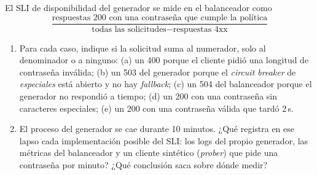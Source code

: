 \documentclass[variant=guia,cover=institutional,mode=screen]{ua-engineering-v6-article}
\begin{document}
\begin{uaexercise}
El SLI de disponibilidad del generador se mide en el balanceador como
\[
\frac{\text{respuestas 200 con una contraseña que cumple la política}}{\text{todas las solicitudes} - \text{respuestas 4xx}}
\]
\begin{enumerate}
\item Para cada caso, indique si la solicitud suma al numerador, solo al denominador o a ninguno: (a) un 400 porque el cliente pidió una longitud de contraseña inválida; (b) un 503 del generador porque el \emph{circuit breaker} de \emph{especiales} está abierto y no hay \emph{fallback}; (c) un 504 del balanceador porque el generador no respondió a tiempo; (d) un 200 con una contraseña sin caracteres especiales; (e) un 200 con una contraseña válida que tardó 2\,s.
\item El proceso del generador se cae durante 10 minutos. ¿Qué registra en ese lapso cada implementación posible del SLI: los logs del propio generador, las métricas del balanceador y un cliente sintético (\emph{prober}) que pide una contraseña por minuto? ¿Qué conclusión saca sobre dónde medir?
\end{enumerate}
\end{uaexercise}
\end{document}
